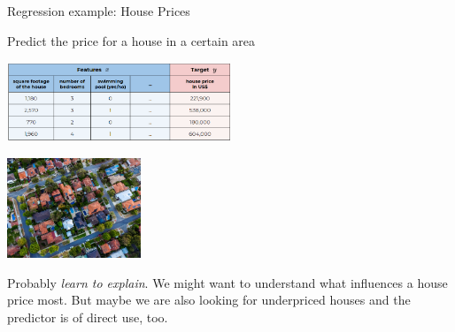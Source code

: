   



  


\begin{vbframe}{Regression example: House Prices}


  Predict the price for a house in a certain area
    
    
    \begin{center}
    \includegraphics[width=0.5\textwidth]{figure_man/ml-basics-supervised-task-houses-data.png} 
    
    \lz
    
    \includegraphics[width=0.3\textwidth]{figure_man/ml-basics-supervised-task-houses-pic.jpg} 
    
    \end{center}

    Probably \textit{learn to explain}. We might want to understand what influences 
    a house price most. But maybe we are also looking for underpriced houses and
    the predictor is of direct use, too.
    

\end{vbframe}

